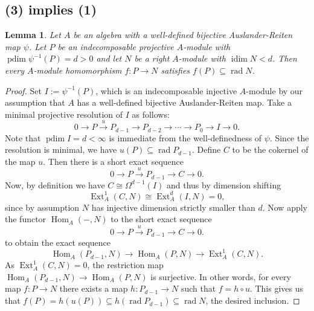 \documentclass[a4paper]{amsart}
\newtheorem{lemma}[theorem]{Lemma}
\theoremstyle{definition}
\theoremstyle{remark}
\numberwithin{equation}{section}
\newcommand{\Ext}{\operatorname{Ext}}
\newcommand{\pdim}{\operatorname{pdim}}
\newcommand{\idim}{\operatorname{idim}}
\newcommand{\Hom}{\operatorname{Hom}}
\newcommand{\rad}{\operatorname{\mathrm{rad}}}
\begin{document}
\subsection{(3) implies (1)}
\begin{lemma} \label{mainlemma}
Let $A$ be an algebra with a well-defined bijective Auslander-Reiten map $\psi$. 
Let $P$ be an indecomposable projective $A$-module with $\pdim \psi^{-1}(P)=d>0$ and let $N$ be a right $A$-module with $\idim N < d$. Then every $A$-module homomorphism $f: P \rightarrow N$ satisfies $f(P) \subseteq \rad N$.
\end{lemma}
\begin{proof}
Set $I:=\psi^{-1}(P)$, which is an indecomposable injective $A$-module by our assumption that $A$ has a well-defined bijective Auslander-Reiten map.
Take a minimal projective resolution of $I$ as follows:
$$0 \rightarrow P \xrightarrow{u} P_{d-1} \rightarrow P_{d-2} \rightarrow \cdots \rightarrow P_0 \rightarrow I \rightarrow 0.$$
Note that $\pdim I=d< \infty$ is immediate from the well-definedness of $\psi$.
Since the resolution is minimal, we have $u(P) \subseteq \rad P_{d-1}$. Define $C$ to be the cokernel of the map $u$. Then there is a short exact sequence 
$$0 \rightarrow P \xrightarrow{u} P_{d-1} \rightarrow C \rightarrow 0.$$
Now, by definition we have $C \cong \Omega^{d-1}(I)$ and thus by dimension shifting
$$\Ext_A^1(C,N) \cong \Ext_A^d(I,N)=0,$$
since by assumption $N$ has injective dimension strictly smaller than $d$.
Now apply the functor $\Hom_A(-,N)$ to the short exact sequence 
$$0 \rightarrow P \xrightarrow{u} P_{d-1} \rightarrow C \rightarrow 0.$$
to obtain the exact sequence
$$\Hom_A(P_{d-1},N) \rightarrow \Hom_A(P,N) \rightarrow \Ext_A^1(C,N).$$
As $\Ext_A^1(C,N)=0$, the restriction map $\Hom_A(P_{d-1},N) \rightarrow \Hom_A(P,N)$ is surjective. In other words, for every map $f: P \rightarrow N$ there exists a map $h: P_{d-1} \rightarrow N$ such that $f=h \circ u$.
This gives us that $f(P)=h(u(P)) \subseteq h(\rad P_{d-1}) \subseteq \rad N$, the desired inclusion.
\end{proof}
\end{document}
